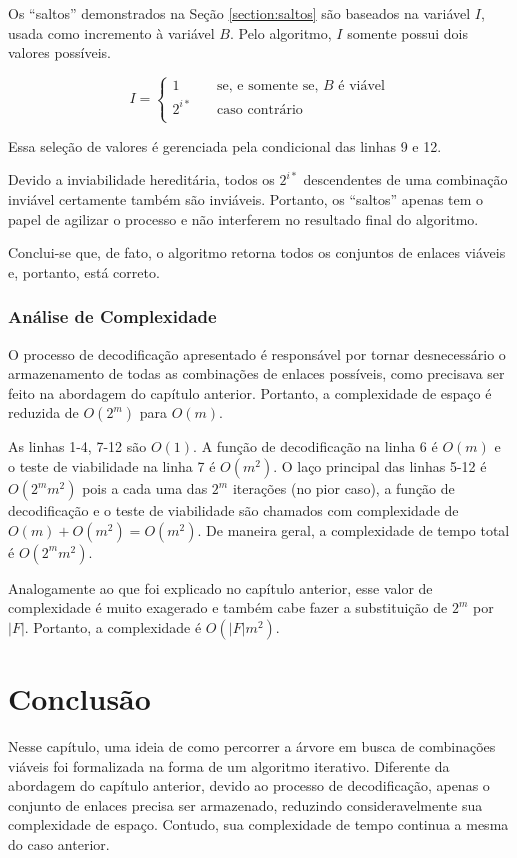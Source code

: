 Os ``saltos'' demonstrados na Seção \ref{section:saltos} são baseados na variável $I$, usada como incremento à variável $B$. Pelo algoritmo, $I$ somente possui dois valores possíveis. 

\[ I =
\begin{cases}
	1	& \quad	\text{se, e somente se, } B \text{ é viável} \\
	2^{i*}	& \quad	\text{caso contrário} \\
  \end{cases}
\]

Essa seleção de valores é gerenciada pela condicional das linhas 9 e 12.

Devido a inviabilidade hereditária, todos os $2^{i*}$ descendentes de uma combinação inviável certamente também são inviáveis. Portanto, os ``saltos'' apenas tem o papel de agilizar o processo e não interferem no resultado final do algoritmo.

Conclui-se que, de fato, o algoritmo retorna todos os conjuntos de enlaces viáveis e, portanto, está correto.

\subsubsection{Análise de Complexidade}

O processo de decodificação apresentado é responsável por tornar desnecessário o armazenamento de todas as combinações de enlaces possíveis, como precisava ser feito na abordagem do capítulo anterior. Portanto, a complexidade de espaço é reduzida de $O(2^m)$ para $O(m)$.

	As linhas 1-4, 7-12 são $O(1)$. A função de decodificação na linha 6 é $O(m)$ e o teste de viabilidade na linha 7 é $O(m^2)$. O laço principal das linhas 5-12 é $O(2^mm^2)$ pois a cada uma das $2^m$ iterações (no pior caso), a função de decodificação e o teste de viabilidade são chamados com complexidade de $O(m) + O(m^2) = O(m^2)$. De maneira geral, a complexidade de tempo total é  $O(2^mm^2)$. 

Analogamente ao que foi explicado no capítulo anterior, esse valor de complexidade é muito exagerado e também cabe fazer a substituição de $2^m$ por $|F|$. Portanto, a complexidade é $O(|F|m^2)$.

\section{Conclusão}
\label{section:conclusao3}

Nesse capítulo, uma ideia de como percorrer a árvore em busca de combinações viáveis foi formalizada na forma de um algoritmo iterativo. Diferente da abordagem do capítulo anterior, devido ao processo de decodificação, apenas o conjunto de enlaces precisa ser armazenado, reduzindo consideravelmente sua complexidade de espaço. Contudo, sua complexidade de tempo continua a mesma do caso anterior.
